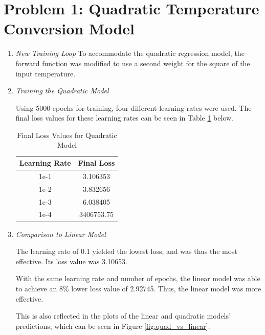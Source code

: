 \documentclass{article}
\begin{document}


\section{Problem 1: Quadratic Temperature Conversion Model}
\begin{enumerate}[label=\alph*. ]
    \item{\textit{New Training Loop}}
    To accommodate the quadratic regression model, the forward function was modified to use a second weight for the square of the input temperature.
    \item{\textit{Training the Quadratic Model}}
    
    Using 5000 epochs for training, four different learning rates were used. The final loss values for these learning rates can be seen in Table \ref{tab:quad_loss} below.

    \begin{table}[htbp]
        \centering
        \begin{tabular}{|c|c|}
            \hline
            \textbf{Learning Rate} & \textbf{Final Loss} \\
            \hline
            1e-1 & 3.106353 \\
            \hline
            1e-2 & 3.832656 \\
            \hline
            1e-3 & 6.038405 \\
            \hline
            1e-4 & 3406753.75 \\
            \hline
        \end{tabular}
        \caption{Final Loss Values for Quadratic Model}
        \label{tab:quad_loss}
        
    \end{table}

    \item{\textit{Comparison to Linear Model}}
    
    The learning rate of 0.1 yielded the lowest loss, and was thus the most effective. Its loss value was 3.10653.

    With the same learning rate and number of epochs, the linear model was able to achieve an 8\% lower loss value of 2.92745. Thus, the linear model was more effective.

    This is also reflected in the plots of the linear and quadratic models' predictions, which can be seen in Figure \ref{fig:quad_vs_linear}.


\end{enumerate}
\end{document}
